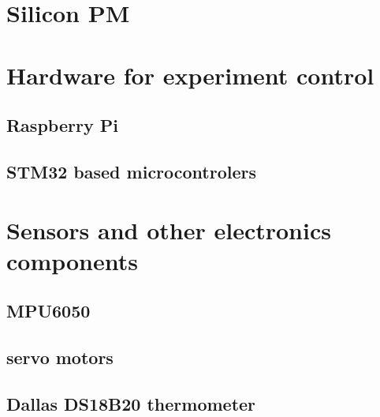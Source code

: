 \section{Silicon PM}


\section{Hardware for experiment control}
\subsection{Raspberry Pi}

\subsection{STM32 based microcontrolers}

\section{Sensors and other electronics components}

\subsection{MPU6050}

\subsection{servo motors}

\subsection{Dallas DS18B20 thermometer}
